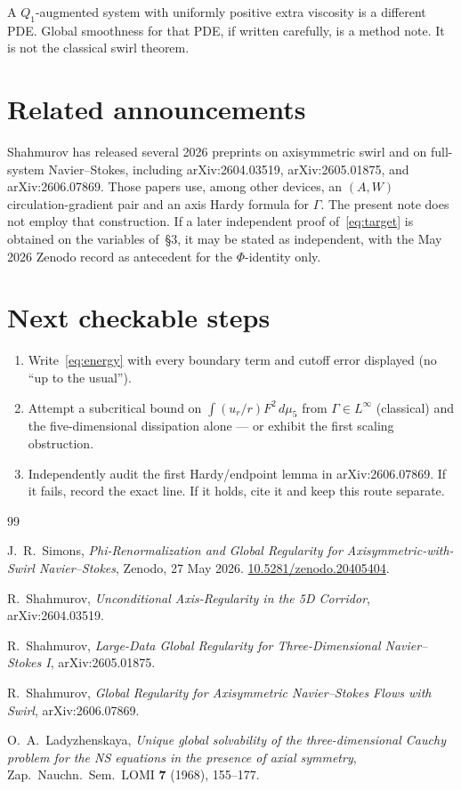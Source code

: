 \documentclass[11pt]{article}
\begin{document}
A \(Q_1\)-augmented system with uniformly positive extra viscosity is a
different PDE. Global smoothness for that PDE, if written carefully, is a
method note. It is not the classical swirl theorem.

\section{Related announcements}

Shahmurov has released several 2026 preprints on axisymmetric swirl and
on full-system Navier--Stokes, including
arXiv:2604.03519, arXiv:2605.01875, and arXiv:2606.07869.
Those papers use, among other devices, an \((A,W)\) circulation-gradient
pair and an axis Hardy formula for \(\Gamma\).
The present note does not employ that construction.
If a later independent proof of~\eqref{eq:target} is obtained on the
variables of~\S3, it may be stated as independent, with the May 2026
Zenodo record as antecedent for the \(\Phi\)-identity only.

\section{Next checkable steps}

\begin{enumerate}[leftmargin=1.2em]
\item Write~\eqref{eq:energy} with every boundary term and cutoff error
displayed (no ``up to the usual'').
\item Attempt a subcritical bound on \(\int (u_r/r)F^2\,d\mu_5\) from
\(\Gamma\in L^\infty\) (classical) and the five-dimensional dissipation
alone --- or exhibit the first scaling obstruction.
\item Independently audit the first Hardy/endpoint lemma in
arXiv:2606.07869. If it fails, record the exact line. If it holds,
cite it and keep this route separate.
\end{enumerate}

\begin{thebibliography}{99}

J.\ R.\ Simons,
\textit{Phi-Renormalization and Global Regularity for Axisymmetric-with-Swirl Navier--Stokes},
Zenodo, 27 May 2026.
\href{https://doi.org/10.5281/zenodo.20405404}{10.5281/zenodo.20405404}.

R.\ Shahmurov,
\textit{Unconditional Axis-Regularity in the 5D Corridor},
arXiv:2604.03519.

R.\ Shahmurov,
\textit{Large-Data Global Regularity for Three-Dimensional Navier--Stokes I},
arXiv:2605.01875.

R.\ Shahmurov,
\textit{Global Regularity for Axisymmetric Navier--Stokes Flows with Swirl},
arXiv:2606.07869.

O.\ A.\ Ladyzhenskaya,
\textit{Unique global solvability of the three-dimensional Cauchy problem
for the NS equations in the presence of axial symmetry},
Zap.\ Nauchn.\ Sem.\ LOMI \textbf{7} (1968), 155--177.

\end{thebibliography}
\end{document}
